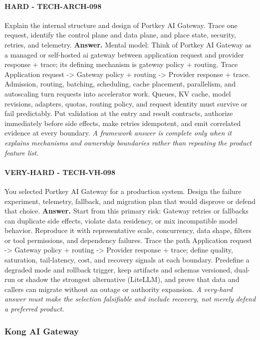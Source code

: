\paragraph{HARD - TECH-ARCH-098} Explain the internal structure and design of Portkey AI Gateway. Trace one request, identify the control plane and data plane, and place state, security, retries, and telemetry.
\textbf{Answer.} Mental model: Think of Portkey AI Gateway as a managed or self-hosted ai gateway between application request and provider response + trace; its defining mechanism is gateway policy + routing. Trace Application request -> Gateway policy + routing -> Provider response + trace. Admission, routing, batching, scheduling, cache placement, parallelism, and autoscaling turn requests into accelerator work. Queues, KV cache, model revisions, adapters, quotas, routing policy, and request identity must survive or fail predictably. Put validation at the entry and result contracts, authorize immediately before side effects, make retries idempotent, and emit correlated evidence at every boundary.
\textit{A framework answer is complete only when it explains mechanisms and ownership boundaries rather than repeating the product feature list.}
\paragraph{VERY-HARD - TECH-VH-098} You selected Portkey AI Gateway for a production system. Design the failure experiment, telemetry, fallback, and migration plan that would disprove or defend that choice.
\textbf{Answer.} Start from this primary risk: Gateway retries or fallbacks can duplicate side effects, violate data residency, or mix incompatible model behavior. Reproduce it with representative scale, concurrency, data shape, filters or tool permissions, and dependency failures. Trace the path Application request -> Gateway policy + routing -> Provider response + trace; define quality, saturation, tail-latency, cost, and recovery signals at each boundary. Predefine a degraded mode and rollback trigger, keep artifacts and schemas versioned, dual-run or shadow the strongest alternative (LiteLLM), and prove that data and callers can migrate without an outage or authority expansion.
\textit{A very-hard answer must make the selection falsifiable and include recovery, not merely defend a preferred product.}
\subsubsection*{Kong AI Gateway}
